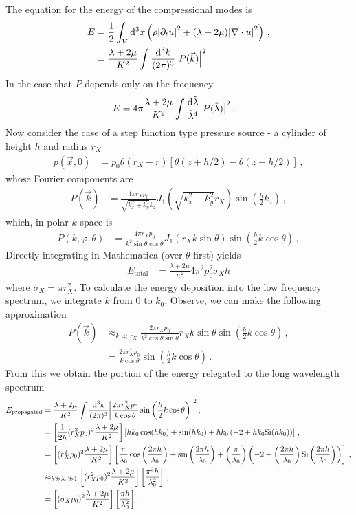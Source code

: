 \documentclass{article}
\newcommand*\diff{\mathop{}\!\mathrm{d}}
\newcommand*\te[1]{\text{#1}}
\newcommand*\p[1]{\left(#1\right)}
\newcommand*\ps[1]{\left[#1\right]}
\newcommand*\f[2]{\frac{#1}{#2}}
\begin{document}
The equation for the energy of the compressional modes is
\begin{align}
E&=\f12\int_V\diff^3x\p{\rho\abs{\partial_t u}^2+(\lambda+2\mu)\abs{\nabla\cdot u}^2}\,,\\
&=\f{\lambda+2\mu}{K^2}\int\f{\diff^3 k}{(2\pi)^3}\abs{P(\vec k)}^2
\end{align}
In the case that $P$ depends only on the frequency
\begin{align}
E&=4\pi\f{\lambda+2\mu}{K^2}\int\f{\diff\tilde\lambda}{\tilde\lambda^4}\abs{P(\tilde\lambda)}^2\,.
\end{align}
Now consider the case of a step function type pressure source - a cylinder of height $h$ and radius $r_X$
\begin{align}
p(\vec x,0)&=p_0\theta(r_X-r)\ps{\theta(z+h/2)-\theta(z-h/2)}\,,
\end{align}
whose Fourier components are
\begin{align}
P(\vec k)&=\f{4\pi r_X p_0}{\sqrt{k_x^2+k_y^2}k_z}J_1\p{\sqrt{k_x^2+k_y^2}r_X}\sin\p{\f{h}{2}k_z}\,,
\end{align}
which, in polar $k$-space is
\begin{align}
P(k,\varphi,\theta)&=\f{4\pi r_X p_0}{k^2\sin\theta\cos\theta}J_1\p{r_Xk\sin\theta}\sin\p{\f{h}{2}k\cos\theta}\,,
\end{align}
Directly integrating in Mathematica (over $\theta$ first) yields
\begin{align}
E_{\te{total}}&=\f{\lambda+2\mu}{K^2}4\pi^2p_0^2\sigma_Xh
\end{align}
where $\sigma_X=\pi r_X^2$. To calculate the energy deposition into the low frequency spectrum, we integrate $k$ from $0$ to $k_0$. Observe, we can make the following approximation
\begin{align}
P(\vec k)&\approx_{k\ll r_X}\f{2\pi r_Xp_0}{k^2\cos\theta\sin\theta}r_X k\sin\theta\sin\p{\f{h}{2}k\cos\theta}\,,\\
&=\f{2\pi r_X^2 p_0}{k\cos\theta}\sin\p{\f{h}{2}k\cos\theta}\,.
\end{align}
From this we obtain the portion of the energy relegated to the long wavelength spectrum
\begin{align}
E_{\te{propagated}}&=\f{\lambda+2\mu}{K^2}\int\f{\diff^3 k}{(2\pi)^3}\abs{\f{2\pi r_X^2 p_0}{k\cos\theta}\sin\p{\f{h}{2}k\cos\theta}}^2\,,\\
&=\ps{\f{1}{2h}(r_X^2p_0)^2\f{\lambda+2\mu}{K^2}}\ps{hk_0\cos(hk_0)+\sin(hk_0)+hk_0\p{-2+hk_0\te{Si}(hk_0)}}\,,\\
&=\ps{(r_X^2p_0)^2\f{\lambda+2\mu}{K^2}}\ps{\f{\pi}{\lambda_0}\cos\p{\f{2\pi h}{\lambda_0}}+\sin\p{\f{2\pi h}{\lambda_0}}+\p{\f{\pi}{\lambda_0}}\p{-2+\p{\f{2\pi h}{\lambda_0}}\te{Si}\p{\f{2\pi h}{\lambda_0}}}}\,,\\
&\approx_{h\gg\lambda_0\gg1}\ps{(r_X^2p_0)^2\f{\lambda+2\mu}{K^2}}\ps{\f{\pi^3 h}{\lambda_0^2}}\,,\\
&=\ps{(\sigma_Xp_0)^2\f{\lambda+2\mu}{K^2}}\ps{\f{\pi h}{\lambda_0^2}}\,.
\end{align}
\end{document}

